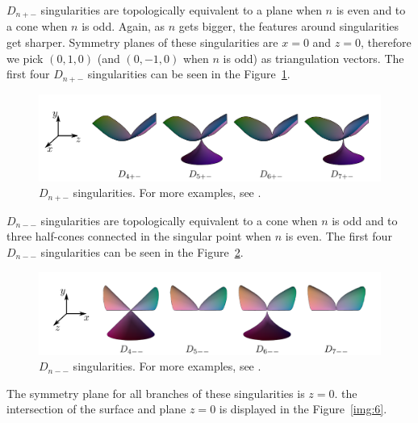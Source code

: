$D_{n+-}$ singularities are topologically equivalent to a plane when $n$ is
even and to a cone when $n$ is odd. Again, as $n$ gets bigger, the features
around singularities get sharper. Symmetry planes of these singularities
are $x=0$ and $z=0$, therefore we pick $(0, 1, 0)$ (and $(0, -1, 0)$ when $n$ is odd)
as triangulation vectors. The first four $D_{n+-}$ singularities can be seen in
the Figure~\ref{img:7}.

\begin{figure}
    \centerline{\includegraphics[scale=0.5]{images/img7}}
    \caption[$D_{n+-}$ singularities]
    {$D_{n+-}$ singularities. For more examples, see \cite{morris2003client}.}
    \label{img:7}
\end{figure}


$D_{n--}$ singularities are topologically equivalent to a cone when $n$ is
odd and to three half-cones connected in the singular point when $n$ is even.
The first four $D_{n--}$ singularities can be seen in the Figure~\ref{img:8}.

\begin{figure}
    \centerline{\includegraphics[scale=0.5]{images/img8}}
    \caption[$D_{n--}$ singularities]
    {$D_{n--}$ singularities. For more examples, see \cite{morris2003client}.}
    \label{img:8}
\end{figure}

The symmetry plane for all branches of these singularities is $z=0$.
the intersection of the surface and plane $z=0$ is displayed in the Figure~\ref{img:6}.

